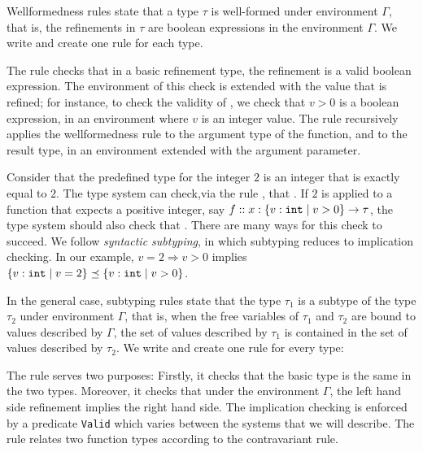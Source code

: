 Wellformedness rules  
state that a type $\tau$ is well-formed under environment
$\Gamma$, that is, the refinements in $\tau$ are boolean 
expressions in the environment $\Gamma$.
%
We write \isWellFormed{\Gamma}{\tau} and create one rule for each type.

The rule \wtBase checks that in a basic refinement type,  
the refinement is a valid boolean expression.
The environment of this check is extended with the value that is refined;
for instance, to check the validity of , 
we check that $v > 0$ is a boolean expression, in an 
environment where $v$ is an integer value.
%
The rule \wtFun recursively applies the wellformedness rule to
the argument type of the function, and to the result type, 
in an environment extended with the argument parameter.

Consider that the predefined type for the integer $2$
is an integer that is exactly equal to $2$.
The type system can check,via the rule \tconst , that 
.
If $2$ is applied to a function that expects a
positive integer, say $f::{x:\left\lbrace v : \texttt{int}\mid v>0\right\rbrace} \rightarrow \tau$,
the type system should also check that 
.
%
There are many ways for this check to succeed.
We follow \textit{syntactic subtyping},
in which subtyping reduces to implication checking.
In our example, $v = 2 \Rightarrow v > 0 $ implies 
$\left\lbrace v : \texttt{int}\mid v=2\right\rbrace \preceq \left\lbrace v : \texttt{int}\mid v>0\right\rbrace$.


In the general case, subtyping rules
state that the type $\tau_1$ is a subtype of the type
$\tau_2$ under environment $\Gamma$, that is, when the free variables
of $\tau_1$ and $\tau_2$
are bound to values described by $\Gamma$, the set of values described
by $\tau_1$ is contained in the set of values described by $\tau_2$. 
We write  and create one rule for every type:

The rule \tsubBase serves two purposes:
Firstly,
it checks that the basic type is the same in the two types.
Moreover, it checks that under the environment $\Gamma$, 
the left hand side refinement implies the right hand side.
The implication checking is enforced by a predicate \texttt{Valid} 
which varies between the systems that we will describe.
%
The rule \tsubFun relates two function types according to the contravariant rule.


